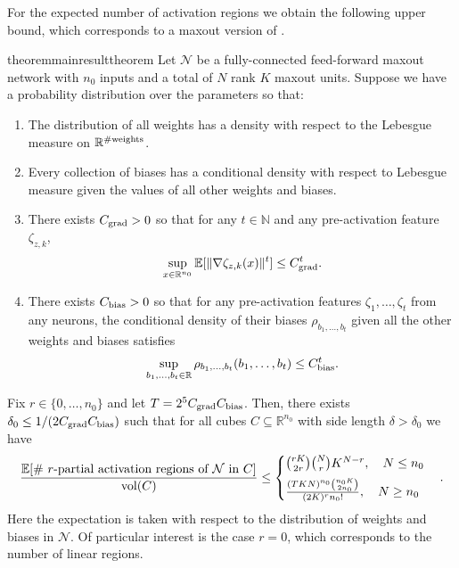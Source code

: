 \documentclass{article}
\theoremstyle{definition}
\newcommand{\cbias}{C_{\text{\normalfont bias}}}
\newcommand{\cgrad}{C_{\text{\normalfont grad}}}
\newcommand{\net}{\mathcal{N}}
\newcommand{\nin}{n_0}
\newcommand{\vol}{\operatorname{vol}}
\begin{document}
For the expected number of activation regions we obtain the following upper bound, which corresponds to a maxout version of \citep[Theorem~10]{NIPS2019_8328}. 
\begin{restatable}{theorem}{mainresulttheorem}
    \label{th:main_result}
     Let $\net$ be a fully-connected feed-forward maxout network with $\nin$ inputs and a total of $N$ rank $K$ maxout units. 
     Suppose we have a probability distribution over the parameters so that: 
    \begin{enumerate}[leftmargin=*]
        \item The distribution of all weights has a density with respect to the Lebesgue measure on $\mathbb{R}^{\# \text{\normalfont weights}}$.
        \item Every collection of biases has a conditional density with respect to Lebesgue measure given the values of all other weights and biases. 
        \item There exists $C_{\text{\normalfont grad}} > 0$ so that for any $t\in \mathbb{N}$ and any pre-activation feature $\zeta_{z,k}$, 
        \begin{align*}
            \sup\limits_{x \in \mathbb{R}^{\nin}} \mathbb{E}[\| \nabla \zeta_{z, k}(x) \|^t] \leq C^t_{\text{\normalfont grad}}.
        \end{align*} 
        \item There exists $C_{\text{\normalfont bias}} > 0$ so that for any pre-activation features $\zeta_1, \ldots, \zeta_t$ from any neurons, the conditional density of their biases $\rho_{b_{1}, \dots, b_{t}}$ given all the other weights and biases satisfies 
        \begin{align*}
            \sup \limits_{b_{1}, \dots, b_{t}\in \mathbb{R}} \rho_{b_{1}, \dots, b_{t}} (b_{1}, \dots, b_{t}) \leq C_{\text{\normalfont bias}}^t.
        \end{align*}
    \end{enumerate}
    Fix $r \in \{0, \dots, \nin\}$ and let $T = 2^5 \cgrad \cbias$. 
    Then, there exists $\delta_0\leq 1/(2 \cgrad \cbias)$ such that for all cubes $C \subseteq\mathbb{R}^{\nin}$ with side length $\delta>\delta_0$ we have 
    \begin{align*}
        \frac{\mathbb{E}[\# \text{ \normalfont$r$-partial activation regions of } \mathcal{N} \text{ \normalfont in } C]}{\vol(C)} \leq
        \begin{cases}
            \binom{rK}{2r} \binom{N}{r} K^{N - r}, \quad N \leq \nin
            \\[5pt]
            \frac{(T K N)^{\nin} \binom{\nin K}{2 \nin} }{(2 K)^r \nin!}, \quad N \geq \nin
        \end{cases}. 
    \end{align*}
    Here the expectation is taken with respect to the distribution of weights and biases in $\net$. 
    Of particular interest is the case $r=0$, which corresponds to the number of linear regions. 
\end{restatable}
\end{document}
